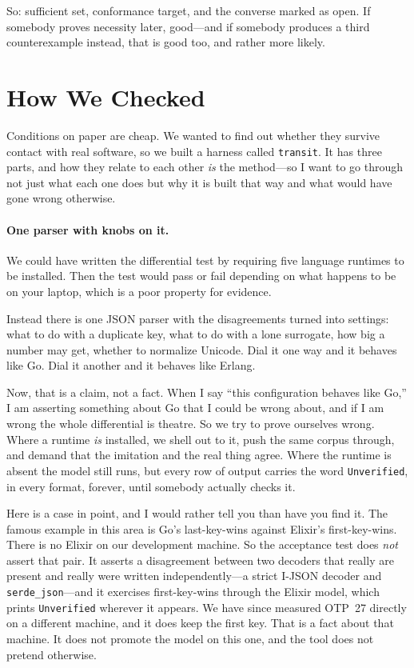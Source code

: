 \documentclass[11pt]{article}
\newcommand{\transit}{\texttt{transit}}
\begin{document}
So: sufficient set, conformance target, and the converse marked as open. If
somebody proves necessity later, good---and if somebody produces a third
counterexample instead, that is good too, and rather more likely.

\section{How We Checked}
\label{sec:method}

Conditions on paper are cheap. We wanted to find out whether they survive
contact with real software, so we built a harness called \transit{}. It has
three parts, and how they relate to each other \emph{is} the method---so I
want to go through not just what each one does but why it is built that way
and what would have gone wrong otherwise.

\paragraph{One parser with knobs on it.}
We could have written the differential test by requiring five language
runtimes to be installed. Then the test would pass or fail depending on what
happens to be on your laptop, which is a poor property for evidence.

Instead there is one JSON parser with the disagreements turned into settings:
what to do with a duplicate key, what to do with a lone surrogate, how big a
number may get, whether to normalize Unicode. Dial it one way and it behaves
like Go. Dial it another and it behaves like Erlang.

Now, that is a claim, not a fact. When I say ``this configuration behaves like
Go,'' I am asserting something about Go that I could be wrong about, and if I
am wrong the whole differential is theatre. So we try to prove ourselves
wrong. Where a runtime \emph{is} installed, we shell out to it, push the same
corpus through, and demand that the imitation and the real thing agree. Where
the runtime is absent the model still runs, but every row of output carries the
word \texttt{Unverified}, in every format, forever, until somebody actually
checks it.

Here is a case in point, and I would rather tell you than have you find it.
The famous example in this area is Go's last-key-wins against Elixir's
first-key-wins. There is no Elixir on our development machine. So the
acceptance test does \emph{not} assert that pair. It asserts a disagreement
between two decoders that really are present and really were written
independently---a strict I-JSON decoder and \texttt{serde\_json}---and it
exercises first-key-wins through the Elixir model, which prints
\texttt{Unverified} wherever it appears. We have since measured OTP~27
directly on a different machine, and it does keep the first key. That is a
fact about that machine. It does not promote the model on this one, and the
tool does not pretend otherwise.
\end{document}
